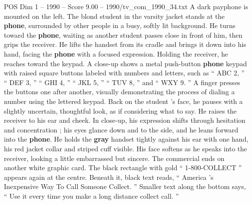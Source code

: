 \begin{textsample}{POS Dim 1 – 1990 – Score 9.00 – 1990/tv\_com\_1990\_34.txt}
A dark payphone is mounted on the left.
The blond student in the varsity jacket stands at the \textbf{phone}, surrounded by other people in a busy, softly lit background.
He turns toward the \textbf{phone}, waiting as another student passes close in front of him, then grips the receiver.
He lifts the handset from its cradle and brings it down into his hand, facing the \textbf{phone} with a focused expression.
Holding the receiver, he reaches toward the keypad.
A close-up shows a metal push-button \textbf{phone} keypad with raised square buttons labeled with numbers and letters, such as “ ABC 2, ” “ DEF 3, ” “ GHI 4, ” “ JKL 5, ” “ TUV 8, ” and “ WXY 9. ” A finger presses the buttons one after another, visually demonstrating the process of dialing a number using the lettered keypad.
Back on the student ’s face, he pauses with a slightly uncertain, thoughtful look, as if considering what to say.
He raises the receiver to his ear and cheek.
In close-up, his expression shifts through hesitation and concentration ; his eyes glance down and to the side, and he leans forward into the \textbf{phone}.
He holds the \textbf{gray} handset tightly against his ear with one hand, his red jacket collar and striped cuff visible.
His face softens as he speaks into the receiver, looking a little embarrassed but sincere.
The commercial ends on another white graphic card.
The black rectangle with gold “ 1-800-COLLECT ” appears again at the centre.
Beneath it, black text reads, “ America ’s Inexpensive Way To Call Someone Collect. ” Smaller text along the bottom says, “ Use it every time you make a long distance collect call. ”

\end{textsample}
